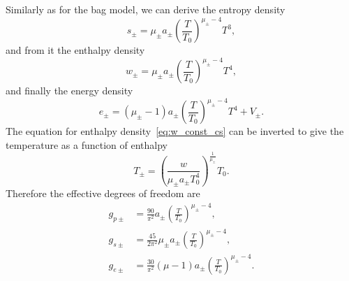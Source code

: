 Similarly as for the bag model, we can derive the entropy density
\begin{equation}
s_\pm = \mu_\pm a_\pm \left( \frac{T}{T_0} \right)^{\mu_\pm - 4} T^3,
\end{equation}
and from it the enthalpy density
\begin{equation}
w_\pm = \mu_\pm a_\pm \left( \frac{T}{T_0} \right)^{\mu_\pm - 4} T^4,
\label{eq:w_const_cs}
\end{equation}
and finally the energy density
\begin{equation}
e_\pm = (\mu_\pm - 1) a_\pm \left( \frac{T}{T_0} \right)^{\mu_\pm - 4} T^4 + V_\pm.
\end{equation}
The equation for enthalpy density~\eqref{eq:w_const_cs} can be inverted to give the temperature as a function of enthalpy
\begin{equation}
T_\pm = \left( \frac{w}{\mu_\pm a_\pm T_0^4} \right)^\frac{1}{\mu_\pm} T_0.
\end{equation}
Therefore the effective degrees of freedom are
\begin{align}
g_{p\pm} &= \frac{90}{\pi^2} a_\pm \left( \frac{T}{T_0} \right)^{\mu_\pm - 4}, \\
g_{s\pm} &= \frac{45}{2\pi^2} \mu_\pm a_\pm \left( \frac{T}{T_0} \right)^{\mu_\pm - 4}, \\
g_{e\pm} &= \frac{30}{\pi^2} (\mu - 1) a_\pm \left( \frac{T}{T_0} \right)^{\mu_\pm - 4}.
\end{align}


